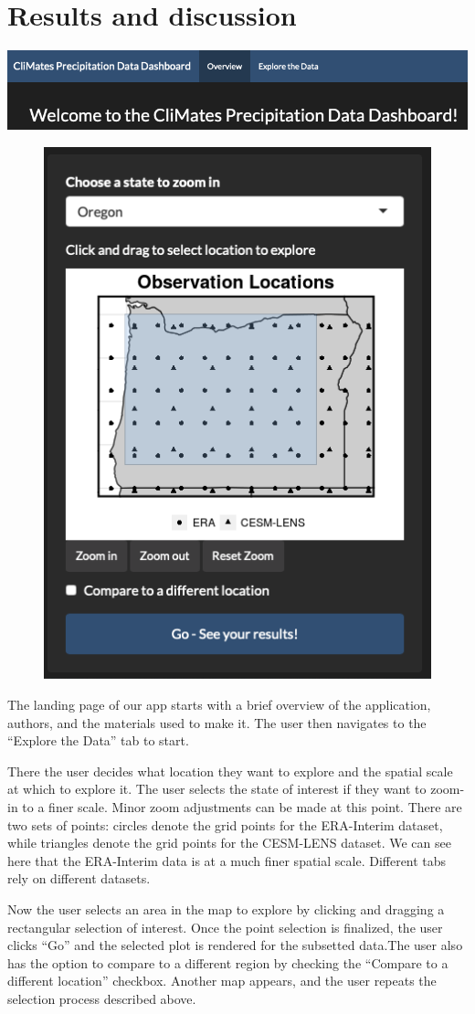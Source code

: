 \documentclass[10pt,letterpaper]{article}
\begin{document}
\section*{Results and discussion}

\begin{center}
  \includegraphics[width = .9\textwidth]{graphics/overview}
\end{center}


\begin{figure}
  \includegraphics[width=.45\textwidth]{graphics/brushedpoints}
\end{figure}

The landing page of our app starts with a brief overview of the application, authors, and the materials used to make it. The user then navigates to the “Explore the Data” tab to start.




There the user decides what location they want to explore and the spatial scale at which to explore it. The user selects the state of interest if they want to zoom-in to a finer scale. Minor zoom adjustments can be made at this point. There are two sets of points: circles denote the grid points for the ERA-Interim dataset, while triangles denote the grid points for the CESM-LENS dataset. We can see here that the ERA-Interim data is at a much finer spatial scale. Different tabs rely on different datasets.

Now the user selects an area in the map to explore by clicking and dragging a rectangular selection of interest. Once the point selection is finalized, the user clicks “Go” and the selected plot is rendered for the subsetted data.The user also has the option to compare to a different region by checking the “Compare to a different location” checkbox. Another map appears, and the user repeats the selection process described above.
\end{document}
